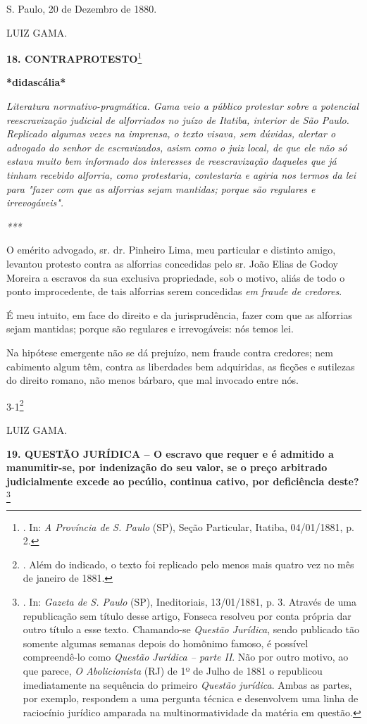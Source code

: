 S. Paulo, 20 de Dezembro de 1880.

LUIZ GAMA.

\textbf{18. CONTRAPROTESTO}\footnote{. In: \emph{A Província de S.
  Paulo} (SP), Seção Particular, Itatiba, 04/01/1881, p. 2.}

\textbf{*didascália*}

\emph{Literatura normativo-pragmática. Gama veio a público protestar
sobre a potencial reescravização judicial de alforriados no juízo de
Itatiba, interior de São Paulo. Replicado algumas vezes na imprensa, o
texto visava, sem dúvidas, alertar o advogado do senhor de escravizados,
asism como o juiz local, de que ele não só estava muito bem informado
dos interesses de reescravização daqueles que já tinham recebido
alforria, como protestaria, contestaria e agiria nos termos da lei para
"fazer com que as alforrias sejam mantidas; porque são regulares e
irrevogáveis". }

\emph{***}

O emérito advogado, sr. dr. Pinheiro Lima, meu particular e distinto
amigo, levantou protesto contra as alforrias concedidas pelo sr. João
Elias de Godoy Moreira a escravos da sua exclusiva propriedade, sob o
motivo, aliás de todo o ponto improcedente, de tais alforrias serem
concedidas \emph{em} \emph{fraude de credores}.

É meu intuito, em face do direito e da jurisprudência, fazer com que as
alforrias sejam mantidas; porque são regulares e irrevogáveis: nós temos
lei.

Na hipótese emergente não se dá prejuízo, nem fraude contra credores;
nem cabimento algum têm, contra as liberdades bem adquiridas, as ficções
e sutilezas do direito romano, não menos bárbaro, que mal invocado entre
nós.

3-1\footnote{. Além do indicado, o texto foi replicado pelo menos mais
  quatro vez no mês de janeiro de 1881.}

LUIZ GAMA.

\textbf{19. QUESTÃO JURÍDICA -- O escravo que requer e é admitido a
manumitir-se, por indenização do seu valor, se o preço arbitrado
judicialmente excede ao pecúlio, continua cativo, por deficiência
deste?}\footnote{. In: \emph{Gazeta de S. Paulo} (SP), Ineditoriais,
  13/01/1881, p. 3. Através de uma republicação sem título desse artigo,
  Fonseca resolveu por conta própria dar outro título a esse texto.
  Chamando-se \emph{Questão Jurídica}, sendo publicado tão somente
  algumas semanas depois do homônimo famoso, é possível compreendê-lo
  como \emph{Questão Jurídica -- parte II}. Não por outro motivo, ao que
  parece, \emph{O Abolicionista} (RJ) de 1º de Julho de 1881 o
  republicou imediatamente na sequência do primeiro \emph{Questão
  jurídica}. Ambas as partes, por exemplo, respondem a uma pergunta
  técnica e desenvolvem uma linha de raciocínio jurídico amparada na
  multinormatividade da matéria em questão.}

